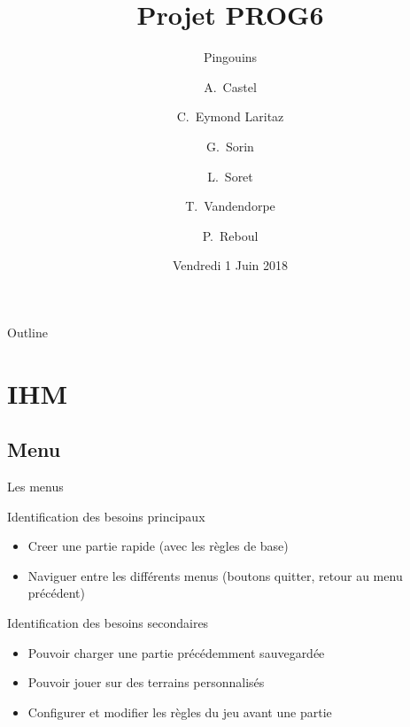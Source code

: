 \documentclass{beamer}
\title{Projet PROG6}
\subtitle{Pingouins}
\author{A.~Castel \and C.~Eymond Laritaz \and G.~Sorin \and L.~Soret \and T.~Vandendorpe \and P.~Reboul}
\institute[Université Grenoble-Alpes] %
{
  UFR IM²AG\\
  Université Grenoble-Alpes
}
\date{Vendredi 1 Juin 2018}
\begin{document}
\begin{frame}
  \titlepage
\end{frame}

\begin{frame}{Outline}
  \tableofcontents
\end{frame}

\section{IHM}

\subsection{Menu}

\begin{frame}{Les menus}
  \begin{block}{Identification des besoins principaux}
	\begin{itemize}
	\item <1-> Creer une partie rapide (avec les règles de base)
	\item <2-> Naviguer entre les différents menus (boutons quitter, retour au menu précédent)
  	\end{itemize}
  \end{block}
\end{frame}

\begin{frame}{}
  \begin{block}{Identification des besoins secondaires}
	\begin{itemize}
	\item <1-> Pouvoir charger une partie précédemment sauvegardée
	\item <2-> Pouvoir jouer sur des terrains personnalisés
	\item <3-> Configurer et modifier les règles du jeu avant une partie
  	\end{itemize}
  \end{block}
\end{frame}
\end{document}
